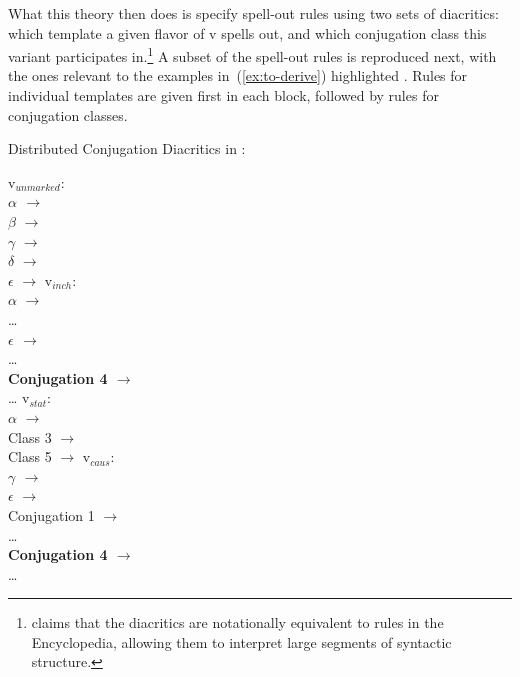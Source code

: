 What this theory then does is specify spell-out rules using two sets of diacritics: which template a given flavor of v spells out, and which conjugation class this variant participates in.\footnote{\citet[227ff41]{arad05} claims that the diacritics are notationally equivalent to rules in the Encyclopedia, allowing them to interpret large segments of syntactic structure.} A subset of the spell-out rules is reproduced next, with the ones relevant to the examples in~(\ref{ex:to-derive}) highlighted \citep[230--231]{arad05}. Rules for individual templates are given first in each block, followed by rules for conjugation classes.

\pex Distributed Conjugation Diacritics in \cite{arad05}: \label{ex:arad-classes}
\begin{multicols}{2}
	\a  v$_{unmarked}$:\\
			\textbf{$\alpha$ $\rightarrow$ {\tkal}}\\
			$\beta$ $\rightarrow$ {\tnif}\\
			$\gamma$ $\rightarrow$ {\tpie}\\
			$\delta$ $\rightarrow$ {\thif}\\
			$\epsilon$ $\rightarrow$ {\thit}
	\a v$_{inch}$:\\
			$\alpha$ $\rightarrow$ {\tkal}\\
			\dots \\
			\textbf{$\epsilon$ $\rightarrow$ {\thit}}\\
			\dots \\
			\textbf{Conjugation 4 $\rightarrow$ {\thit}}\\
			\dots
		\columnbreak
	\a v$_{stat}$:\\
			$\alpha$ $\rightarrow$ {\tkal}\\
			Class 3 $\rightarrow$ {\tkal}\\
			Class 5 $\rightarrow$ {\tkal}
	\a v$_{caus}$:\\
			\textbf{$\gamma$ $\rightarrow$ {\tpie}}\\
			$\epsilon$ $\rightarrow$ {\thif}\\
			Conjugation 1 $\rightarrow$ {\tkal}\\
			\dots \\
			\textbf{Conjugation 4 $\rightarrow$ {\tpie}}\\
			\dots
	\end{multicols}
\xe

